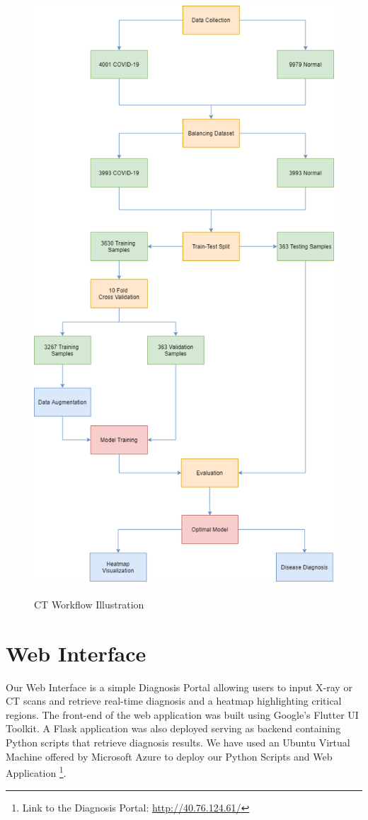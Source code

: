 \begin{figure}[H]
	\centering
	\includegraphics[width=13cm, height= 22.5cm]{Images/CT Workflow.png}

	\caption{\small CT Workflow Illustration}
	\label{fig:CT Illustration}
\end{figure}


\section{Web Interface}

Our Web Interface is a simple Diagnosis Portal allowing users to input X-ray or CT scans and retrieve real-time diagnosis and a heatmap highlighting critical regions. The front-end of the web application was built using Google's Flutter UI Toolkit. A Flask application was also deployed serving as backend containing Python scripts that retrieve diagnosis results. We have used an Ubuntu Virtual Machine offered by Microsoft Azure to deploy our Python Scripts and Web Application \footnote{Link to the Diagnosis Portal: \url{http://40.76.124.61/}}.

